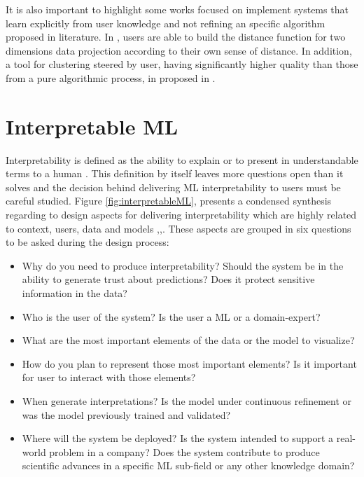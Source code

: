 It is also important to highlight some works focused on implement systems that learn explicitly from user knowledge and not refining an specific algorithm proposed in literature. In \cite{Brown2012}, users are able to build the distance function for two dimensions data projection according to their own sense of distance. In addition, a tool for clustering steered by user, having significantly higher quality than those from a pure algorithmic process, in proposed in \cite{Chang2016}.

\section{Interpretable ML}
\label{section2.2}

Interpretability is defined as the ability to explain or to present in understandable terms to a human \cite{Doshi-Velez2017c}. This definition by itself leaves more questions open than it solves and the decision behind delivering ML interpretability to users must be careful studied. Figure \ref{fig:interpretableML}, presents a condensed synthesis regarding to design aspects for delivering interpretability which are highly related to context, users, data and models \cite{Hohman2018},\cite{Doshi-Velez2017c},\cite{Lipton2017}. These aspects are grouped in six questions to be asked during the design process:

\begin{itemize}
    \item Why do you need to produce interpretability? Should the system be in the ability to generate trust about predictions? Does it protect sensitive information in the data?
    \item Who is the user of the system? Is the user a ML or a domain-expert?
    \item What are the most important elements of the data or the model to visualize?
    \item How do you plan to represent those most important elements? Is it important for user to interact with those elements?
    \item When generate interpretations? Is the model under continuous refinement  or was the model previously trained and validated?
    \item Where will the system be deployed? Is the system intended to support a real-world problem in a company? Does the system contribute to produce scientific advances in a specific ML sub-field or any other knowledge domain?  
\end{itemize}

